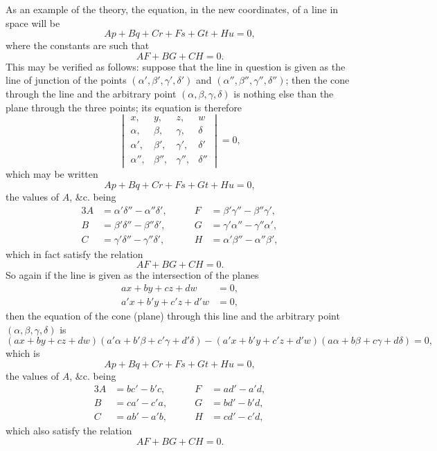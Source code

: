 \documentclass[11pt,a4paper]{book}
\begin{document}
As an example of the theory, the equation, in the new coordinates, of a line in space will be
\[
Ap + Bq + Cr + Fs + Gt + Hu = 0,
\]
where the constants are such that
\[
AF + BG + CH = 0.
\]
This may be verified as follows: suppose that the line in question is given as the line of junction of the points $(\alpha', \beta', \gamma', \delta')$ and $(\alpha'', \beta'', \gamma'', \delta'')$; then the cone through the line and the arbitrary point $(\alpha, \beta, \gamma, \delta)$ is nothing else than the plane through the three points; its equation is therefore
\[
\begin{vmatrix}
x, & y, & z, & w \\
\alpha, & \beta, & \gamma, & \delta \\
\alpha', & \beta', & \gamma', & \delta' \\
\alpha'', & \beta'', & \gamma'', & \delta''
\end{vmatrix} = 0,
\]
which may be written
\[
Ap + Bq + Cr + Fs + Gt + Hu = 0,
\]
the values of $A$, \&c. being
\begin{alignat*}{3}
A &= \alpha'\delta'' - \alpha''\delta', &\qquad F &= \beta'\gamma'' - \beta''\gamma',\\
B &= \beta'\delta'' - \beta''\delta', &\qquad G &= \gamma'\alpha'' - \gamma''\alpha',\\
C &= \gamma'\delta'' - \gamma''\delta', &\qquad H &= \alpha'\beta'' - \alpha''\beta',
\end{alignat*}
which in fact satisfy the relation
\[
AF + BG + CH = 0.
\]
So again if the line is given as the intersection of the planes
\begin{align*}
ax + by + cz + dw &= 0,\\
a'x + b'y + c'z + d'w &= 0,
\end{align*}
then the equation of the cone (plane) through this line and the arbitrary point $(\alpha, \beta, \gamma, \delta)$ is
\[
(ax + by + cz + dw)(a'\alpha + b'\beta + c'\gamma + d'\delta) - (a'x + b'y + c'z + d'w)(a\alpha + b\beta + c\gamma + d\delta) = 0,
\]
which is
\[
Ap + Bq + Cr + Fs + Gt + Hu = 0,
\]
the values of $A$, \&c. being
\begin{alignat*}{3}
A &= bc' - b'c, &\qquad F &= ad' - a'd,\\
B &= ca' - c'a, &\qquad G &= bd' - b'd,\\
C &= ab' - a'b, &\qquad H &= cd' - c'd,
\end{alignat*}
which also satisfy the relation
\[
AF + BG + CH = 0.
\]
\end{document}
